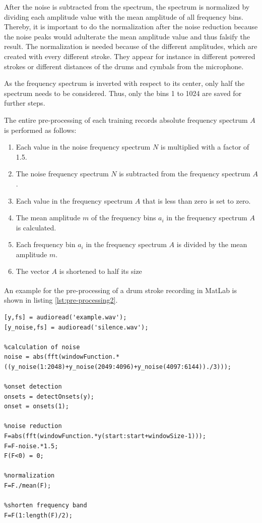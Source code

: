 After the noise is subtracted from the spectrum, the spectrum is normalized by dividing each amplitude value with the mean amplitude of all frequency bins. Thereby, it is important to do the normalization after the noise reduction because the noise peaks would adulterate the mean amplitude value and thus falsify the result. The normalization is needed because of the different amplitudes, which are created with every different stroke. They appear for instance in different powered strokes or different distances of the drums and cymbals from the microphone.

As the frequency spectrum is inverted with respect to its center, only half the spectrum needs to be considered. Thus, only the bins 1 to 1024 are saved for further steps.

The entire pre-processing of each training records absolute frequency spectrum $A$ is performed as follows:

\begin{enumerate}
	\item Each value in the noise frequency spectrum $N$ is multiplied with a factor of 1.5.
	\item The noise frequency spectrum $N$ is subtracted from the frequency spectrum $A$.
	\item Each value in the frequency spectrum $A$ that is less than zero is set to zero.
	\item The mean amplitude $m$ of the frequency bins $a_i$ in the frequency spectrum $A$ is calculated.
	\item Each frequency bin $a_i$ in the frequency spectrum $A$ is divided by the mean amplitude $m$.
	\item The vector $A$ is shortened to half its size
\end{enumerate}

An example for the pre-processing of a drum stroke recording in MatLab\textsuperscript{\textregistered} is shown in listing \ref{lst:pre-processing2}.

\begin{lstlisting}[caption={pre-processing of an example drum stroke recording.},label={lst:pre-processing2}]
%read in audio files
[y,fs] = audioread('example.wav');
[y_noise,fs] = audioread('silence.wav');

%calculation of noise
noise = abs(fft(windowFunction.*((y_noise(1:2048)+y_noise(2049:4096)+y_noise(4097:6144))./3)));

%onset detection
onsets = detectOnsets(y);
onset = onsets(1);

%noise reduction
F=abs(fft(windowFunction.*y(start:start+windowSize-1)));
F=F-noise.*1.5;
F(F<0) = 0;

%normalization
F=F./mean(F);

%shorten frequency band
F=F(1:length(F)/2);
\end{lstlisting}

